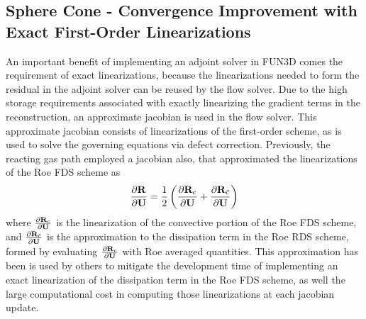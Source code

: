 \subsection{Sphere Cone - Convergence Improvement with Exact First-Order Linearizations}
\label{sec:sphere-cone-exact-approx-convergence}

An important benefit of implementing an adjoint solver in FUN3D comes the
requirement of exact linearizations, because the linearizations needed to form
the residual in the adjoint solver can be reused by the flow solver.
Due to the high storage requirements associated with exactly linearizing the
gradient terms in the reconstruction, an approximate jacobian is used in the
flow solver.  This approximate jacobian consists of linearizations of the
first-order scheme, as is used to solve the governing equations via defect
correction.  Previously, the reacting gas path employed a jacobian also, that
approximated the linearizations of the Roe FDS scheme\cite{gnoffo-tp} as
\begin{equation}
  \frac{\partial \mathbf R_{}}{\partial \mathbf U} = 
  \frac{1}{2} \left( \frac{\partial \mathbf R_{c}}{\partial \mathbf U} + \frac{\partial \mathbf R_{\tilde{c}}}{\partial \mathbf U} \right)
  \label{approx-roe-jac}
\end{equation}
where $\frac{\partial \mathbf R_{c}}{\partial \mathbf U}$ is the linearization of the convective portion of the Roe
FDS scheme, and $\frac{\partial \mathbf R_{\tilde{c}}}{\partial \mathbf U}$ is the approximation to the dissipation
term in the Roe RDS scheme, formed by evaluating $\frac{\partial \mathbf R_{c}}{\partial \mathbf U}$ with Roe
averaged quantities.  This approximation has been is used by others
\cite{rinaldi2014exact} to mitigate the development time of implementing an
exact linearization of the dissipation term in the Roe FDS scheme, as well the
large computational cost in computing those linearizations at each jacobian
update.

